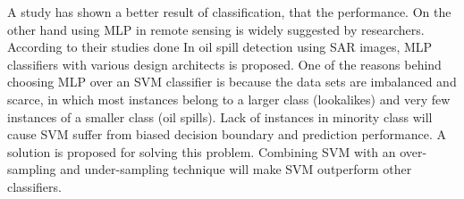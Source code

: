 A study has shown a better result of classification,  that the performance. On the other hand using MLP in remote sensing is widely suggested by researchers\cite{Mera201472,Brekke200595,fingas2014review}. According to their studies done In oil spill detection using SAR images, MLP classifiers with various design architects is proposed. One of the reasons behind choosing MLP over an SVM classifier is because the data sets are imbalanced and scarce, in which most instances belong to a larger class (lookalikes) and very few instances of a smaller class (oil spills). Lack of instances in minority class will cause SVM suffer from biased decision boundary and prediction performance. A solution is proposed for solving this problem. 
Combining SVM with an over-sampling and under-sampling technique will make SVM outperform other classifiers\cite{liu2006boosting}.


